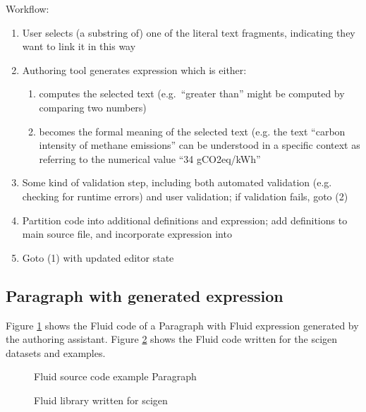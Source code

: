 Workflow:
\begin{enumerate}
\item User selects (a substring of) one of the literal text fragments, indicating they want to link it in this
way
\item Authoring tool generates expression which is either:
  \begin{enumerate}
  \item computes the selected text (e.g.~``greater than'' might be computed by comparing two numbers)
  \item becomes the formal meaning of the selected text (e.g. the text ``carbon intensity of methane
emissions'' can be understood in a specific context as referring to the numerical value ``34 gCO2eq/kWh''
  \end{enumerate}
\item Some kind of validation step, including both automated validation (e.g. checking for runtime errors) and
user validation; if validation fails, goto (2)
\item Partition code into additional definitions and expression; add definitions to main source file, and
incorporate expression into 
\item Goto (1) with updated editor state
\end{enumerate}

\subsection{Paragraph with generated expression}
Figure \ref{fig:fluid-example-paragraph} shows the Fluid code of a Paragraph with Fluid expression generated by the authoring assistant.
Figure \ref{fig:fluid-scigen} shows the Fluid code written for the scigen datasets and examples.
\begin{figure}[h]
    \small
    {}
    \vspace{-0.5em}
    \caption{Fluid source code example Paragraph}
    \label{fig:fluid-example-paragraph}
\end{figure}

\begin{figure}[h]
    \small
    {}
    \vspace{-0.5em}
    \caption{Fluid library written for scigen}
    \label{fig:fluid-scigen}
\end{figure}

